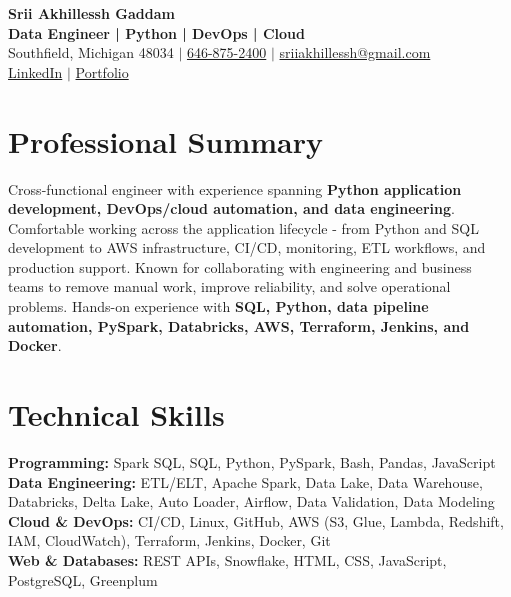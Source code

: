 \documentclass[letterpaper,10pt]{article}
\begin{document}
\fontsize{9.35pt}{10.45pt}\selectfont

\begin{center}
    {\LARGE \textbf{Srii Akhillessh Gaddam}} \\[-1pt]
    \textbf{Data Engineer | Python | DevOps | Cloud} \\[2pt]
    Southfield, Michigan 48034 $|$
    \href{tel:6468752400}{646-875-2400} $|$
    \href{mailto:sriiakhillessh@gmail.com}{sriiakhillessh@gmail.com} \\[1pt]
    \href{https://www.linkedin.com/in/srii-akhiilessh-gaddam-b48668191/}{LinkedIn} $|$
    \href{https://sriiakhillesshg.github.io/portfolio/}{Portfolio}
\end{center}
\vspace{-8pt}

\section{Professional Summary}
\small{Cross-functional engineer with experience spanning \textbf{Python application development, DevOps/cloud automation, and data engineering}. Comfortable working across the application lifecycle - from Python and SQL development to AWS infrastructure, CI/CD, monitoring, ETL workflows, and production support. Known for collaborating with engineering and business teams to remove manual work, improve reliability, and solve operational problems. Hands-on experience with \textbf{SQL, Python, data pipeline automation, PySpark, Databricks, AWS, Terraform, Jenkins, and Docker}.}

\section{Technical Skills}
\small{
\textbf{Programming:} Spark SQL, SQL, Python, PySpark, Bash, Pandas, JavaScript \\
\textbf{Data Engineering:} ETL/ELT, Apache Spark, Data Lake, Data Warehouse, Databricks, Delta Lake, Auto Loader, Airflow, Data Validation, Data Modeling \\
\textbf{Cloud \& DevOps:} CI/CD, Linux, GitHub, AWS (S3, Glue, Lambda, Redshift, IAM, CloudWatch), Terraform, Jenkins, Docker, Git \\
\textbf{Web \& Databases:} REST APIs, Snowflake, HTML, CSS, JavaScript, PostgreSQL, Greenplum
}
\end{document}
